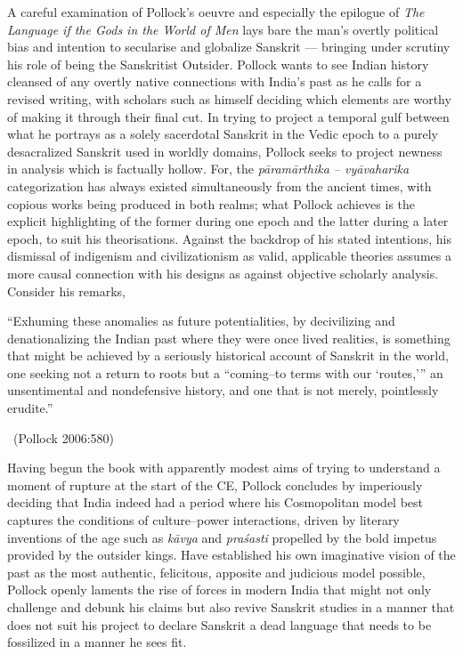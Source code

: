 A careful examination of Pollock’s oeuvre and especially the epilogue of \textit{The Language if the Gods in the World of Men} lays bare the man’s overtly political bias and intention to secularise and globalize Sanskrit — bringing under scrutiny his role of being the Sanskritist Outsider. Pollock wants to see Indian history cleansed of any overtly native connections with India’s past as he calls for a revised writing, with scholars such as himself deciding which elements are worthy of making it through their final cut. In trying to project a temporal gulf between what he portrays as a solely sacerdotal Sanskrit in the Vedic epoch to a purely desacralized Sanskrit used in worldly domains, Pollock seeks to project newness in analysis which is factually hollow. For, the \textit{pāramārthika – vyāvaharika} categorization has always existed simultaneously from the ancient times, with copious works being produced in both realms; what Pollock achieves is the explicit highlighting of the former during one epoch and the latter during a later epoch, to suit his theorisations. Against the backdrop of his stated intentions, his dismissal of indigenism and civilizationism as valid, applicable theories assumes a more causal connection with his designs as against objective scholarly analysis. Consider his remarks,

\begin{myquote}
“Exhuming these anomalies as future potentialities, by decivilizing and denationalizing the Indian past where they were once lived realities, is something that might be achieved by a seriously historical account of Sanskrit in the world, one seeking not a return to roots but a “coming–to terms with our ‘routes,’” an unsentimental and nondefensive history, and one that is not merely, pointlessly erudite.” 

~\hfill (Pollock 2006:580)
\end{myquote}

Having begun the book with apparently modest aims of trying to understand a moment of rupture at the start of the CE, Pollock concludes by imperiously deciding that India indeed had a period where his Cosmopolitan model best captures the conditions of culture–power interactions, driven by literary inventions of the age such as \textit{kāvya} and \textit{praśasti} propelled by the bold impetus provided by the outsider kings. Have established his own imaginative vision of the past as the most authentic, felicitous, apposite and judicious model possible, Pollock openly laments the rise of forces in modern India that might not only challenge and debunk his claims but also revive Sanskrit studies in a manner that does not suit his project to declare Sanskrit a dead language that needs to be fossilized in a manner he sees fit.


